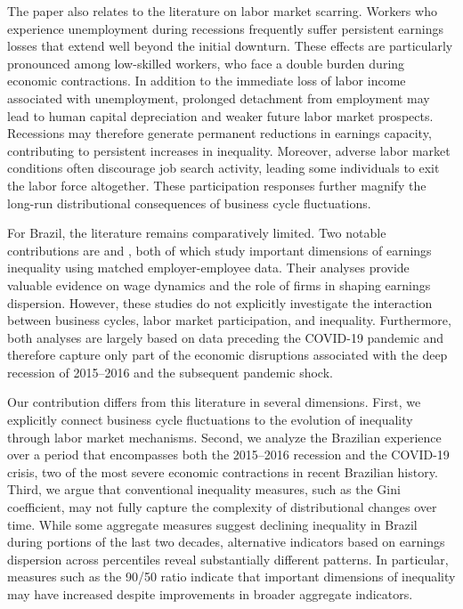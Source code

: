 \documentclass[12pt]{article}
\newcommand{\citeonline}[1]{\citet{#1}}
\begin{document}
	The paper also relates to the literature on labor market scarring. Workers who experience unemployment during recessions frequently suffer persistent earnings losses that extend well beyond the initial downturn. These effects are particularly pronounced among low-skilled workers, who face a double burden during economic contractions. In addition to the immediate loss of labor income associated with unemployment, prolonged detachment from employment may lead to human capital depreciation and weaker future labor market prospects. Recessions may therefore generate permanent reductions in earnings capacity, contributing to persistent increases in inequality. Moreover, adverse labor market conditions often discourage job search activity, leading some individuals to exit the labor force altogether. These participation responses further magnify the long-run distributional consequences of business cycle fluctuations.
	
	For Brazil, the literature remains comparatively limited. Two notable contributions are \citeonline{alvarez2018firms} and \citeonline{engbom2022earnings}, both of which study important dimensions of earnings inequality using matched employer-employee data. Their analyses provide valuable evidence on wage dynamics and the role of firms in shaping earnings dispersion. However, these studies do not explicitly investigate the interaction between business cycles, labor market participation, and inequality. Furthermore, both analyses are largely based on data preceding the COVID-19 pandemic and therefore capture only part of the economic disruptions associated with the deep recession of 2015–2016 and the subsequent pandemic shock.
	
	Our contribution differs from this literature in several dimensions. First, we explicitly connect business cycle fluctuations to the evolution of inequality through labor market mechanisms. Second, we analyze the Brazilian experience over a period that encompasses both the 2015–2016 recession and the COVID-19 crisis, two of the most severe economic contractions in recent Brazilian history. Third, we argue that conventional inequality measures, such as the Gini coefficient, may not fully capture the complexity of distributional changes over time. While some aggregate measures suggest declining inequality in Brazil during portions of the last two decades, alternative indicators based on earnings dispersion across percentiles reveal substantially different patterns. In particular, measures such as the 90/50 ratio indicate that important dimensions of inequality may have increased despite improvements in broader aggregate indicators.
	
\end{document}
